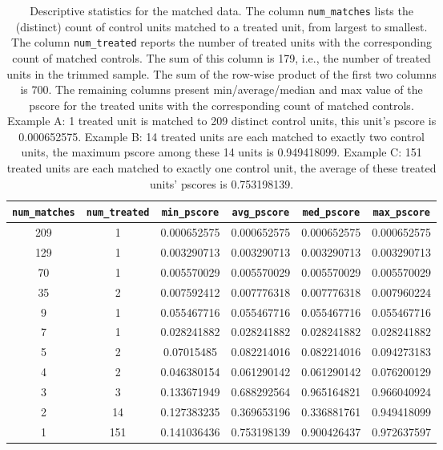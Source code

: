 \documentclass{article}
\begin{document}
\begin{enumerate}[label=\textbf{Q\arabic{enumi}}.,ref=Q\arabic{enumi}, wide=0pt, itemsep=0em, topsep=5pt, labelindent=0pt, resume]
\begin{table}[H]
\centering
\begin{tabular}{|c|c|c|c|c|c|}
\hline
\textbf{\texttt{num\_matches}} & \textbf{\texttt{num\_treated}} & \textbf{\texttt{min\_pscore}} & \textbf{\texttt{avg\_pscore}} & \textbf{\texttt{med\_pscore}} & \textbf{\texttt{max\_pscore}} \\ \hline
209 & 1 & 0.000652575 & 0.000652575 & 0.000652575 & 0.000652575 \\ \hline
129 & 1 & 0.003290713 & 0.003290713 & 0.003290713 & 0.003290713 \\ \hline
70 & 1 & 0.005570029 & 0.005570029 & 0.005570029 & 0.005570029 \\ \hline
35 & 2 & 0.007592412 & 0.007776318 & 0.007776318 & 0.007960224 \\ \hline
9 & 1 & 0.055467716 & 0.055467716 & 0.055467716 & 0.055467716 \\ \hline
7 & 1 & 0.028241882 & 0.028241882 & 0.028241882 & 0.028241882 \\ \hline
5 & 2 & 0.07015485 & 0.082214016 & 0.082214016 & 0.094273183 \\ \hline
4 & 2 & 0.046380154 & 0.061290142 & 0.061290142 & 0.076200129 \\ \hline
3 & 3 & 0.133671949 & 0.688292564 & 0.965164821 & 0.966040924 \\ \hline
2 & 14 & 0.127383235 & 0.369653196 & 0.336881761 & 0.949418099 \\ \hline
1 & 151 & 0.141036436 & 0.753198139 & 0.900426437 & 0.972637597 \\ \hline
\end{tabular}
\caption{Descriptive statistics for the matched data. The column \texttt{num\_matches} lists the (distinct) count of control units matched to a treated unit, from largest to smallest. The column \texttt{num\_treated} reports the number of treated units with the corresponding count of matched controls. The sum of this column is 179, i.e., the number of treated units in the trimmed sample. The sum of the row-wise product of the first two columns is 700. The remaining columns present min/average/median and max value of the pscore for the treated units with the corresponding count of matched controls. Example A: 1 treated unit is matched to 209 distinct control units, this unit's pscore is 0.000652575. Example B: 14 treated units are each matched to exactly two control units, the maximum pscore among these 14 units is 0.949418099. Example C: 151 treated units are each matched to exactly one control unit, the average of these treated units' pscores is 0.753198139.}
\label{tab:matched-set-ds}
\end{table}



\end{enumerate}
\end{document}
